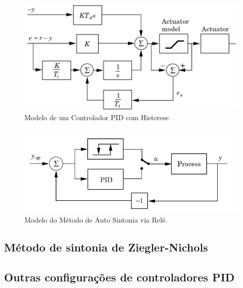 \begin{figure}[htb]
  \caption{Modelo de um Controlador PID com Histerese}
  \begin{center}
      \includegraphics[scale=0.65]{img/pid_antiwindup_astrom_p83}
  \end{center}
  \label{fig:pid_antiwindup_astrom_p83}
\end{figure}

\begin{figure}[htb]
  \caption{Modelo do Método de Auto Sintonia via Relé.}
  \begin{center}
      \includegraphics[scale=0.75]{img/pid_autotuning_relay_astrom_p239}
  \end{center}
  \label{fig:pid_autotuning_relay_astrom_p239}
\end{figure}

\subsection{Método de sintonia de Ziegler-Nichols}

\subsection{Outras configurações de controladores PID}

